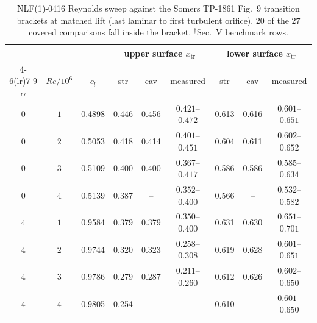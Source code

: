\begin{table}[H]
  \centering\small
  \caption{NLF(1)-0416 Reynolds sweep against the Somers TP-1861 Fig.~9 transition brackets at matched lift (last laminar to first turbulent orifice). $20$ of the $27$ covered comparisons fall inside the bracket. $^\dagger$Sec.~V benchmark rows.}
  \label{t:extnlfsomers}
  \begin{tabular}{cc c ccc ccc}
    \toprule
    & & & \multicolumn{3}{c}{upper surface $x_\mathrm{tr}$} & \multicolumn{3}{c}{lower surface $x_\mathrm{tr}$} \\
    \cmidrule(lr){4-6}\cmidrule(lr){7-9}
    $\alpha$ & $Re/10^6$ & $c_l$ & str & cav & measured & str & cav & measured \\
    \midrule
    $0$ & $1$ & 0.4898 & 0.446 & 0.456 & $0.421$--$0.472$ & 0.613 & 0.616 & $0.601$--$0.651$ \\
    $0$ & $2$ & 0.5053 & 0.418 & 0.414 & $0.401$--$0.451$ & 0.604 & 0.611 & $0.602$--$0.652$ \\
    $0$ & $3$ & 0.5109 & 0.400 & 0.400 & $0.367$--$0.417$ & 0.586 & 0.586 & $0.585$--$0.634$ \\
    $0$ & $4$\rlap{$^\dagger$} & 0.5139 & 0.387 & -- & $0.352$--$0.400$ & 0.566 & -- & $0.532$--$0.582$ \\
    $4$ & $1$ & 0.9584 & 0.379 & 0.379 & $0.350$--$0.400$ & 0.631 & 0.630 & $0.651$--$0.701$ \\
    $4$ & $2$ & 0.9744 & 0.320 & 0.323 & $0.258$--$0.308$ & 0.619 & 0.628 & $0.601$--$0.651$ \\
    $4$ & $3$ & 0.9786 & 0.279 & 0.287 & $0.211$--$0.260$ & 0.612 & 0.626 & $0.602$--$0.650$ \\
    $4$ & $4$\rlap{$^\dagger$} & 0.9805 & 0.254 & -- & -- & 0.610 & -- & $0.601$--$0.650$ \\
    \bottomrule
  \end{tabular}
\end{table}
